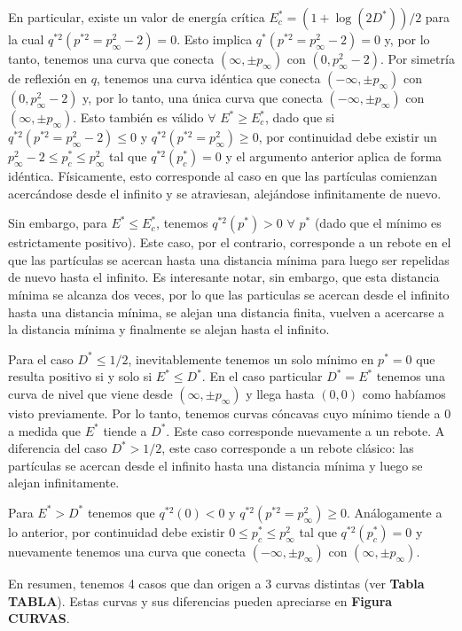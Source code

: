 En particular, existe un valor de energía crítica $E^*_c = (1+\log(2D^*))/2$ para la cual $q^{*2}(p^{*2}=p^2_\infty-2) = 0$. 
Esto implica $q^*(p^{*2}=p^2_\infty-2)=0$ y, por lo tanto, tenemos una curva que conecta $(\infty, \pm p_\infty)$ con $(0,p^2_\infty-2)$.
Por simetría de reflexión en $q$, tenemos una curva idéntica que conecta $(-\infty, \pm p_\infty)$ con $(0,p^2_\infty-2)$ y, por lo tanto, una única curva que conecta $(-\infty, \pm p_\infty)$ con $(\infty, \pm p_\infty)$.
Esto también es válido $\forall$ $E^*\geq E^*_c$, dado que si $q^{*2}(p^{*2}=p_\infty^2-2)\leq 0$ y $q^{*2}(p^{*2}=p_\infty^2)\geq 0$, por continuidad debe existir un $p_\infty^2-2\leq p^*_c\leq p_\infty^2$  tal que $q^{*2}(p^*_c) = 0$ y el argumento anterior aplica de forma idéntica.
Físicamente, esto corresponde al caso en que las partículas comienzan acercándose desde el infinito y se atraviesan, alejándose infinitamente de nuevo. 

Sin embargo, para $E^*\leq E^*_c$, tenemos $q^{*2}(p^*) > 0$  $\forall$ $p^*$ (dado que el mínimo es estrictamente positivo).
Este caso, por el contrario, corresponde a un rebote en el que las partículas se acercan hasta una distancia mínima para luego ser repelidas de nuevo hasta el infinito. 
Es interesante notar, sin embargo, que esta distancia mínima se alcanza dos veces, por lo que las particulas se acercan desde el infinito hasta una distancia mínima, se alejan una distancia finita, vuelven a acercarse a la distancia mínima y finalmente se alejan hasta el infinito.

Para el caso $D^*\leq 1/2$, inevitablemente tenemos un solo mínimo en $p^*=0$ que resulta positivo si y solo si $E^*\leq D^*$. 
En el caso particular $D^*=E^*$ tenemos una curva de nivel que viene desde $(\infty,\pm p_\infty)$ y llega hasta $(0,0)$ como habíamos visto previamente.
Por lo tanto, tenemos curvas cóncavas cuyo mínimo tiende a $0$ a medida que $E^*$ tiende a $D^*$.
Este caso corresponde nuevamente a un rebote.
A diferencia del caso $D^*>1/2$, este caso corresponde a un rebote clásico: las partículas se acercan desde el infinito hasta una distancia mínima y luego se alejan infinitamente.

Para $E^*>D^*$ tenemos que $q^{*2}(0) < 0$ y $q^{*2}(p^{*2}=p_\infty^2)\geq 0$. 
Análogamente a lo anterior, por continuidad debe existir $0\leq p^*_c\leq p_\infty^2$ tal que $q^{*2}(p^*_c) = 0$ y nuevamente tenemos una curva que conecta $(-\infty, \pm p_\infty)$ con $(\infty, \pm p_\infty)$. 

En resumen, tenemos 4 casos que dan origen a 3 curvas distintas (ver \textbf{Tabla TABLA}).
Estas curvas y sus diferencias pueden apreciarse en \textbf{Figura CURVAS}.

